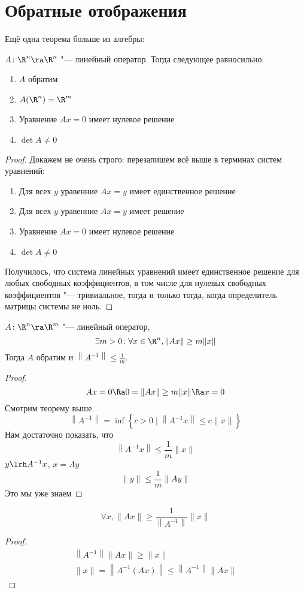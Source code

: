 \section{Обратные отображения}

Ещё одна теорема больше из алгебры:
\begin{theorem}
	$A\colon \R^n \ra \R^n$ "--- линейный оператор. Тогда следующее равносильно:
	\begin{enumerate}
		\item $A$ обратим
		\item $A(\R^n) = \R^m$
		\item Уравнение $Ax = 0$ имеет нулевое решение
		\item $\det A \ne 0$
	\end{enumerate}
\end{theorem}
\begin{proof}
	Докажем не очень строго: перезапишем всё выше в терминах систем уравнений:
	\begin{enumerate}
		\item Для всех $y$ уравенние $Ax = y$ имеет единственное решение
		\item Для всех $y$ уравенние $Ax = y$ имеет решение
		\item Уравнение $Ax = 0$ имеет нулевое решение
		\item $\det A \ne 0$
	\end{enumerate}
	Получилось, что система линейных уравнений имеет единственное решение для любых свободных коэффициентов, в том числе для нулевых свободных коэффициентов "--- тривиальное, тогда и только тогда, когда определитель матрицы системы не ноль.
\end{proof}

\begin{theorem}
	$A\colon \R^n \ra \R^m$ "--- линейный оператор,
	\[ \exists m > 0\colon \forall x \in \R^n, \|Ax\| \ge m\|x\| \]
	Тогда $A$ обратим и $\left\|A^{-1}\right\| \le \frac1m$.
\end{theorem}
\begin{proof}
	\[ Ax = 0 \Ra 0 = \|Ax\| \ge m\|x\| \Ra x = 0 \]
	Смотрим теорему выше.
	\[ \left\|A^{-1}\right\| = \inf \left\{c > 0 \mid \left\|A^{-1} x\right\| \le c \|x\| \right\} \]
	Нам достаточно показать, что
	\[ \left\|A^{-1} x\right\| \le \frac{1}m \|x\| \]
	$y \lrh A^{-1} x$, $x = Ay$
	\[ \|y\| \le \frac{1}m \|Ay\| \]
	Это мы уже знаем
\end{proof}

\begin{Rem}
	\[ \forall x, \|Ax\| \ge \frac{1}{\left\|A^{-1}\right\|} \|x\| \]
\end{Rem}
\begin{proof}
	\begin{gather*}
		\left\| A^{-1} \right\| \|A x\| \ge \|x\| \\
		\|x\| = \left\|A^{-1} (Ax)\right\| \le \left\|A^{-1}\right\| \|A x\|
	\end{gather*}
\end{proof}

